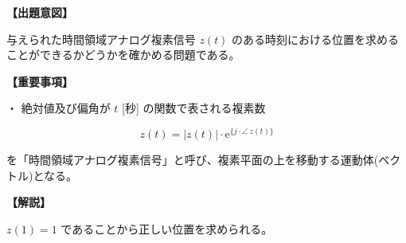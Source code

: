 \noindent \textbf{【出題意図】}

\bigskip
\noindent 与えられた時間領域アナログ複素信号 $z(t)$ のある時刻における位置を求めることができるかどうかを確かめる問題である。

\vspace{1em}
\noindent \textbf{【重要事項】}

\bigskip
\noindent ・ 絶対値及び偏角が $t$ [秒] の関数で表される複素数

\[
z(t) = |z(t)| \cdot \textrm{e}^{\{j \cdot \angle \ z(t)\}}
\]

\medskip
\noindent を「時間領域アナログ複素信号」と呼び、複素平面の上を移動する運動体(ベクトル)となる。

\vspace{1em}
\noindent \textbf{【解説】}

\bigskip
\noindent $z(1) = 1$ であることから正しい位置を求められる。
